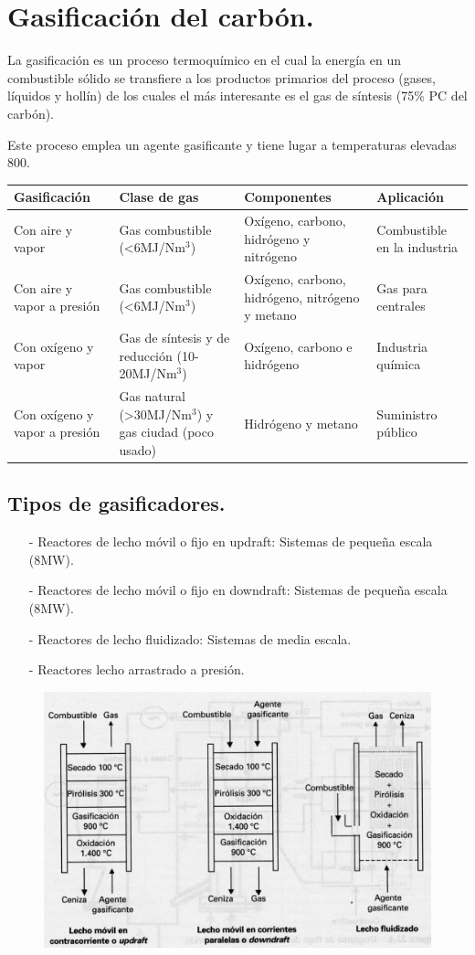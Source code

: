 \section{Gasificación del carbón.}
La gasificación es un proceso termoquímico en el cual la energía en un combustible sólido se transfiere a los productos primarios del proceso (gases, líquidos y hollín) de los cuales el más interesante es el gas de síntesis (75\% PC del carbón).

Este proceso emplea un agente gasificante y tiene lugar a temperaturas elevadas 800\grado.
\begin{table}[H]
	\centering
	\begin{tabular}{p{3cm}p{3cm}p{3cm}p{3cm}}
		\toprule
		Gasificación&Clase de gas&Componentes&Aplicación \\
	 	\midrule
	 	Con aire y vapor				&Gas combustible (<6MJ/Nm$^3$)							& Oxígeno, carbono, hidrógeno y nitrógeno& Combustible en la industria\\
	 	Con aire y vapor a presión		&Gas combustible (<6MJ/Nm$^3$)							&Oxígeno, carbono, hidrógeno, nitrógeno y metano&Gas para centrales \\
	 	Con oxígeno y vapor				&Gas de síntesis y de reducción (10-20MJ/Nm$^3$)		&Oxígeno, carbono e hidrógeno& Industria química \\
	 	Con oxígeno y vapor a presión	&Gas natural (>30MJ/Nm$^3$)	y gas ciudad (poco usado)	&Hidrógeno y metano& Suministro público \\
		\bottomrule
	\end{tabular}
	\label{tab:4x5_table}
\end{table}

\subsection{Tipos de gasificadores.}
\begin{itemize}
	\item [-] Reactores de lecho móvil o fijo en updraft: Sistemas de pequeña escala (8MW).
	\item [-] Reactores de lecho móvil o fijo en downdraft: Sistemas de pequeña escala (8MW).
	\item [-] Reactores de lecho fluidizado: Sistemas de media escala.
	\item [-] Reactores lecho arrastrado a presión.
\end{itemize}
\begin{figure}[H]
	\centering
	\includegraphics[width=0.7\linewidth]{res/tema3/gasificad}
	\label{fig:gasificad}
\end{figure}
\newpage
